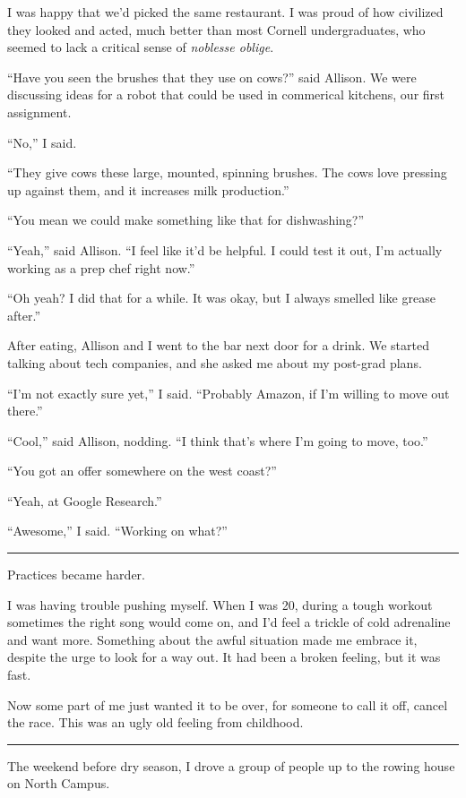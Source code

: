 I was happy that we'd picked the same restaurant.  I was proud of how civilized
they looked and acted, much better than most Cornell undergraduates, who seemed
to lack a critical sense of \textit{noblesse oblige}.

``Have you seen the brushes that they use on cows?'' said Allison.  We were
discussing ideas for a robot that could be used in commerical kitchens, our
first assignment.

``No,'' I said.

``They give cows these large, mounted, spinning brushes. The cows love pressing
up against them, and it increases milk production.'' 

``You mean we could make something like that for dishwashing?''

``Yeah,'' said Allison.  ``I feel like it'd be helpful.  I could test it out,
I'm actually working as a prep chef right now.''

``Oh yeah?  I did that for a while.  It was okay, but I always smelled like
grease after.''

After eating, Allison and I went to the bar next door for a drink.  We started
talking about tech companies, and she asked me about my post-grad plans.  

``I'm not exactly sure yet,'' I said.  ``Probably Amazon, if I'm willing to move
out there.''

``Cool,'' said Allison, nodding.  ``I think that's where I'm going to move,
too.''

``You got an offer somewhere on the west coast?''

``Yeah, at Google Research.''

``Awesome,'' I said.  ``Working on what?''

\plainfancybreak{12pt}{2}{* * *}

Practices became harder.

I was having trouble pushing myself.  When I was 20, during a tough workout
sometimes the right song would come on, and I'd feel a trickle of cold
adrenaline and want more.  Something about the awful situation made me embrace
it, despite the urge to look for a way out.  It had been a broken feeling, but
it was fast.

Now some part of me just wanted it to be over, for someone to call it off,
cancel the race.  This was an ugly old feeling from childhood.

\plainfancybreak{12pt}{2}{* * *}

The weekend before dry season, I drove a group of people up to the rowing house
on North Campus.

